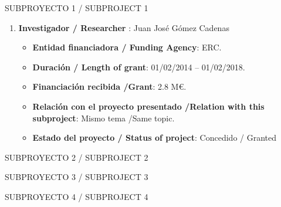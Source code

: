 %
%
%

{\sc SUBPROYECTO 1 / SUBPROJECT 1}

\begin{enumerate}
\item {\bf Investigador / Researcher }: Juan José Gómez Cadenas
\begin{itemize}
\item {\bf Entidad financiadora / Funding Agency}: ERC. 
\item {\bf Duración / Length of grant}: 01/02/2014 -- 01/02/2018. 
\item {\bf Financiación recibida /Grant}: 2.8 M\euro. 
\item {\bf Relación con el proyecto presentado /Relation with this subproject}: Mismo tema /Same topic. 
\item {\bf Estado del proyecto / Status of project}: Concedido / Granted
\end{itemize}
\end{enumerate}

{\sc SUBPROYECTO 2 / SUBPROJECT 2}

{\sc SUBPROYECTO 3 / SUBPROJECT 3}

{\sc SUBPROYECTO 4 / SUBPROJECT 4}

